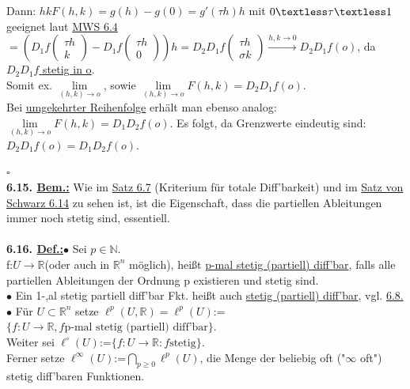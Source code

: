\documentclass[]{scrartcl}
\begin{document}
Dann: $hkF(h,k)=g(h)-g(0)=g'(\tau h)h$ mit $0\textless\tau\textless1$ geeignet 
laut \ul{MWS 6.4}\\
$=(D_1f\begin{pmatrix}
	\tau h\\k
\end{pmatrix}-D_1f\begin{pmatrix}
	\tau h\\0
\end{pmatrix})h=D_2D_1f\begin{pmatrix}
	\tau h \\\sigma k
\end{pmatrix}\xrightarrow{h,k\rightarrow 
0}$\ul{$D_2D_1f(o)$}, da \ul{$D_2D_1f$ stetig in o}.\\
Somit ex. $\lim\limits_{(h,k)\rightarrow o}$, sowie 
$\lim\limits_{(h,k)\rightarrow o}F(h,k)=$\ul{$D_2D_1f(o)$}.\\
Bei \ul{umgekehrter Reihenfolge} erhält man ebenso analog:\\
$\lim\limits_{(h,k)\rightarrow o}F(h,k)=$\ul{$D_1D_2f(o)$}. Es folgt, da 
Grenzwerte eindeutig sind: $D_2D_1f(o)=D_1D_2f(o).$\\
\strut\hfill$\square$\\
\textbf{6.15. \underline{Bem.:}} Wie im \ul{Satz 6.7} 
(Kriterium für totale Diff'barkeit) und im \ul{Satz von Schwarz 6.14} zu sehen 
ist, ist die Eigenschaft, dass die partiellen Ableitungen immer noch stetig 
sind, essentiell.\\
\\
\textbf{6.16. \underline{Def.:}}$\bullet$ Sei $p \in \mathbb{N}$.\\
f:$U\rightarrow\mathbb{R}$(oder auch in $\mathbb{R}^n$ möglich), heißt 
\ul{p-mal stetig (partiell) diff'bar}, falls alle partiellen 
Ableitungen der Ordnung p existieren und stetig sind.\\
$\bullet$ Ein 1-,al stetig partiell diff'bar Fkt. heißt auch \ul{stetig 
(partiell) diff'bar}, vgl. \ul{6.8.}\\
$\bullet$ Für $U\subset\mathbb{R}^n$ setze 
\ul{$\ell^p(U,\mathbb{R})=\ell^p(U)$}:= 
$\{f:U\rightarrow\mathbb{R}, f\text{p-mal stetig (partiell) diff'bar}\}$.\\
Weiter sei \ul{$\ell^\circ(U)$}:=$\{f:U\rightarrow\mathbb{R}:f 
\text{stetig}\}$.\\
Ferner setze \ul{$\ell^\infty(U)$}:=$\bigcap_{p\geq 0} \ell^p(U)$, die Menge 
der beliebig oft ("$\infty$ oft") stetig diff'baren Funktionen.\\
\end{document}
